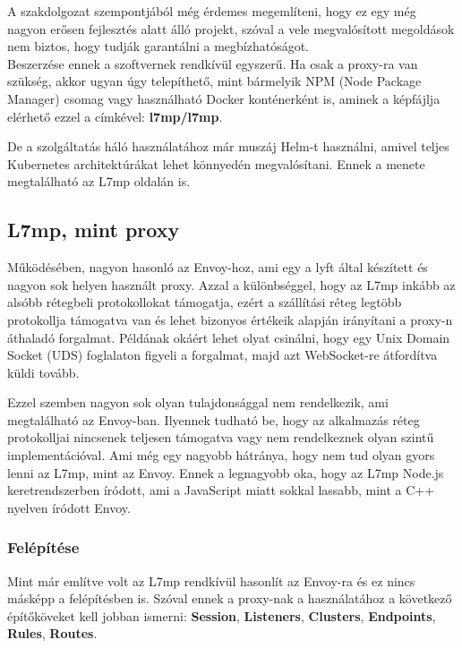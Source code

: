 A szakdolgozat szempontjából még érdemes megemlíteni, hogy ez egy még nagyon 
erősen fejlesztés alatt álló projekt, szóval a vele megvalósított megoldások 
nem biztos, hogy tudják garantálni a megbízhatóságot. \\

Beszerzése ennek a szoftvernek rendkívül egyszerű. Ha csak a proxy-ra van 
szükség, akkor ugyan úgy telepíthető, mint bármelyik NPM (Node Package Manager)
csomag vagy használható Docker konténerként is, aminek a képfájlja elérhető 
ezzel a címkével: \textbf{l7mp/l7mp}. 

De a szolgáltatás háló használatához már muszáj Helm-t használni, amivel 
teljes Kubernetes architektúrákat lehet könnyedén megvalósítani. Ennek a 
menete megtalálható az L7mp oldalán is. 

\subsection{L7mp, mint proxy}

Működésében, nagyon hasonló az Envoy-hoz, ami egy a lyft által készített és 
nagyon sok helyen használt proxy. Azzal a különbséggel, hogy az L7mp inkább 
az alsóbb rétegbeli protokollokat támogatja, ezért a szállítási réteg legtöbb 
protokollja támogatva van és lehet bizonyos értékeik alapján irányítani a 
proxy-n áthaladó forgalmat. Példának okáért lehet olyat csinálni, hogy egy
Unix Domain Socket (UDS) foglalaton figyeli a forgalmat, majd azt WebSocket-re
átfordítva küldi tovább. 

Ezzel szemben nagyon sok olyan tulajdonsággal nem rendelkezik, ami megtalálható
az Envoy-ban. Ilyennek tudható be, hogy az alkalmazás réteg protokolljai nincsenek 
teljesen támogatva vagy nem rendelkeznek olyan szintű implementációval. Ami 
még egy nagyobb hátránya, hogy nem tud olyan gyors lenni az L7mp, mint az Envoy.
Ennek a legnagyobb oka, hogy az L7mp Node.js keretrendszerben íródott, ami a 
JavaScript miatt sokkal lassabb, mint a C++ nyelven íródott Envoy.

\subsubsection{Felépítése}

Mint már említve volt az L7mp rendkívül hasonlít az Envoy-ra és ez nincs másképp 
a felépítésben is. Szóval ennek a proxy-nak a használatához a következő 
építőköveket kell jobban ismerni: \textbf{Session}, \textbf{Listeners}, \textbf{Clusters}, \textbf{Endpoints}, \textbf{Rules}, \textbf{Routes}.\\

